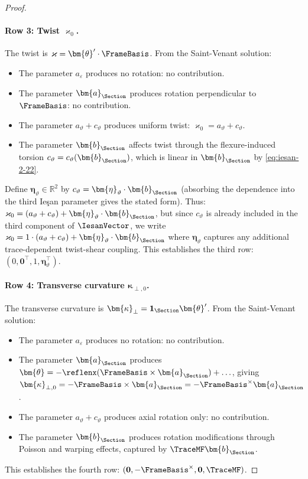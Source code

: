 \begin{Old}
\begin{proof}
\paragraph{Row 3: Twist $\varkappa_0$.}
The twist is $\varkappa = \bm{\theta}' \cdot \FrameBasis$. From the Saint-Venant solution:
\begin{itemize}
\item The parameter $a_\varepsilon$ produces no rotation: no contribution.
\item The parameter $\bm{a}_{\Section}$ produces rotation perpendicular to $\FrameBasis$: no contribution.
\item The parameter $a_\vartheta + c_\vartheta$ produces uniform twist: 
$\varkappa_0 = a_\vartheta + c_\vartheta$.
\item The parameter $\bm{b}_{\Section}$ affects twist through the flexure-induced 
torsion $c_\vartheta = c_\vartheta(\bm{b}_{\Section})$, which is linear in $\bm{b}_{\Section}$ 
by \eqref{eq:iesan-2-22}.
\end{itemize}
Define $\bm{\eta}_\vartheta \in \mathbb{R}^2$ by $c_\vartheta = \bm{\eta}_\vartheta \cdot \bm{b}_{\Section}$ 
(absorbing the dependence into the third Ieşan parameter gives the stated form). 
Thus: $\varkappa_0 = (a_\vartheta + c_\vartheta) + \bm{\eta}_\vartheta \cdot \bm{b}_{\Section}$, 
but since $c_\vartheta$ is already included in the third component of $\IesanVector$, 
we write $\varkappa_0 = 1 \cdot (a_\vartheta + c_\vartheta) + \bm{\eta}_\vartheta \cdot \bm{b}_{\Section}$ 
where $\bm{\eta}_\vartheta$ captures any additional trace-dependent twist-shear coupling. 
This establishes the third row: $(0, \mathbf{0}^\top, 1, \bm{\eta}_\vartheta^\top)$.

\paragraph{Row 4: Transverse curvature $\bm{\kappa}_{\perp,0}$.}
The transverse curvature is $\bm{\kappa}_\perp = \mathbf{1}_{\Section} \bm{\theta}'$. 
From the Saint-Venant solution:
\begin{itemize}
\item The parameter $a_\varepsilon$ produces no rotation: no contribution.
\item The parameter $\bm{a}_{\Section}$ produces $\bm{\theta} = -\reflenx(\FrameBasis \times \bm{a}_{\Section}) + \ldots$, 
giving $\bm{\kappa}_{\perp,0} = -\FrameBasis \times \bm{a}_{\Section} = -\FrameBasis^\times \bm{a}_{\Section}$.
\item The parameter $a_\vartheta + c_\vartheta$ produces axial rotation only: no contribution.
\item The parameter $\bm{b}_{\Section}$ produces rotation modifications through Poisson 
and warping effects, captured by $\TraceMF \bm{b}_{\Section}$.
\end{itemize}
This establishes the fourth row: $(\mathbf{0}, -\FrameBasis^\times, \mathbf{0}, \TraceMF)$.


\end{proof}
\end{Old}
